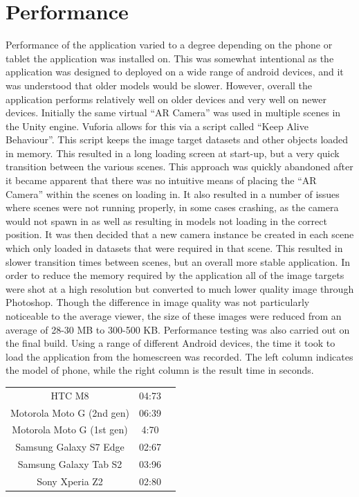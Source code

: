 \section{Performance}
Performance of the application varied to a degree depending on the phone or tablet the application was installed on. This was somewhat intentional as the application was designed to deployed on a wide range of android devices, and it was understood that older models would be slower. However, overall the application performs relatively well on older devices and very well on newer devices.
Initially the same virtual “AR Camera” was used in multiple scenes in the Unity engine. Vuforia allows for this via a script called “Keep Alive Behaviour”. This script keeps the image target datasets and other objects loaded in memory. This resulted in a long loading screen at start-up, but a very quick transition between the various scenes. This approach was quickly abandoned after it became apparent that there was no intuitive means of placing the “AR Camera” within the scenes on loading in. It also resulted in a number of issues where scenes were not running properly, in some cases crashing, as the camera would not spawn in as well as resulting in models not loading in the correct position.
It was then decided that a new camera instance be created in each scene which only loaded in datasets that were required in that scene. This resulted in slower transition times between scenes, but an overall more stable application.
In order to reduce the memory required by the application all of the image targets were shot at a high resolution but converted to much lower quality image through Photoshop. Though the difference in image quality was not particularly noticeable to the average viewer, the size of these images were reduced from an average of 28-30 MB to 300-500 KB. 
Performance testing was also carried out on the final build. Using a range of different Android devices, the time it took to load the application from the homescreen was recorded. The left column indicates the model of phone, while the right column is the result time in seconds.

\begin{center}
	\begin{tabular}{ |c|c|c| } 
		\hline
		HTC M8 & 04:73 \\ 
		Motorola Moto G (2nd gen) & 06:39 \\
		Motorola Moto G (1st gen) & 4:70 \\ 
		Samsung Galaxy S7 Edge & 02:67 \\ 
		Samsung Galaxy Tab S2   & 03:96 \\ 
		Sony Xperia Z2 & 02:80 \\ 
		\hline
	\end{tabular}
\end{center}

